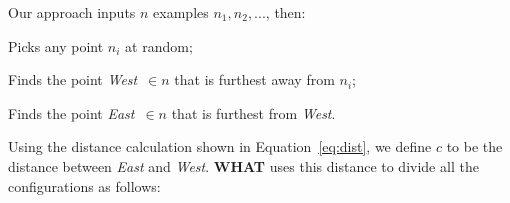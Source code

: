 \documentclass{sig-alternative}
\newcommand{\what}{{\bf WHAT }}
\begin{document}
Our approach inputs $n$
examples $n_1,n_2,...$, then:
\begin{compactenum}
\item
Picks any
point $n_i$ at random;
\item
Finds
 the point  {\em West}~$\in n$ that is
furthest away from $n_i$;
\item Finds the point {\em East}~$\in n$
that is furthest from {\em West}.
\end{compactenum}
Using the distance calculation shown in Equation~\ref{eq:dist}, 
we define $c$ to be the distance between {\em East}
and {\em West}.
\what uses this distance to divide all the configurations as follows:
\end{document}
